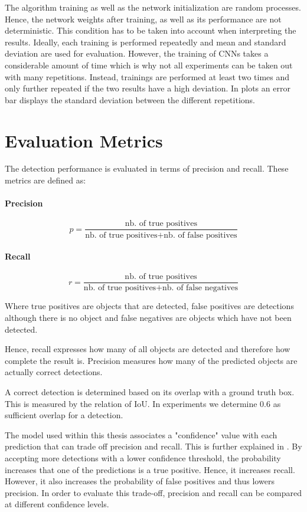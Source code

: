 The algorithm training as well as the network initialization are random processes. Hence, the network weights after training, as well as its performance are not deterministic. This condition has to be taken into account when interpreting the results. Ideally, each training is performed repeatedly and mean and standard deviation are used for evaluation. However, the training of \acp{CNN} takes a considerable amount of time which is why not all experiments can be taken out with many repetitions. Instead, trainings are performed at least two times and only further repeated if the two results have a high deviation. In plots an error bar displays the standard deviation between the different repetitions.


\section{Evaluation Metrics}
\label{sec:background:metrics}
The detection performance is evaluated in terms of precision and recall. These metrics are defined as:

\paragraph{Precision}
$$p = \frac{\text{nb. of true positives}}{\text{nb. of true positives} + \text{nb. of false positives}}$$

\paragraph{Recall}
$$r = \frac{\text{nb. of true positives}}{\text{nb. of true positives} + \text{nb. of false negatives}}$$

Where true positives are objects that are detected, false positives are detections although there is no object and false negatives are objects which have not been detected.

Hence, recall expresses how many of all objects are detected and therefore how complete the result is. Precision measures how many of the predicted objects are actually correct detections.

A correct detection is determined based on its overlap with a ground truth box. This is measured by the relation of \ac{IoU}. In experiments we determine 0.6 as sufficient overlap for a detection. 

The model used within this thesis associates a "confidence" value with each prediction that can trade off precision and recall. This is further explained in . By accepting more detections with a lower confidence threshold, the probability increases that one of the predictions is a true positive. Hence, it increases recall. However, it also increases the probability of false positives and thus lowers precision. In order to evaluate this trade-off, precision and recall can be compared at different confidence levels.

